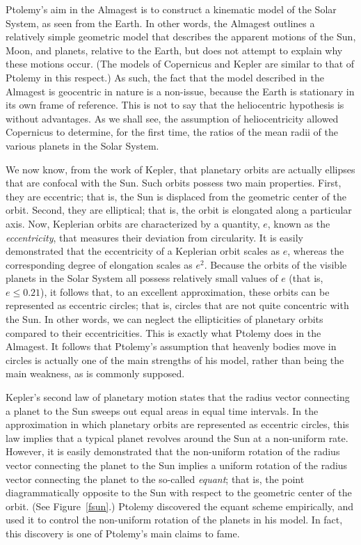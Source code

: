  Ptolemy's aim in the Almagest is to construct a kinematic model of
  the Solar System, as seen from the Earth. In other words, the Almagest outlines a relatively simple geometric model  that describes
 the apparent motions of the Sun, Moon, and planets, relative to the Earth, but does not attempt to explain
 why  these motions occur. (The models of Copernicus and Kepler are similar to that of Ptolemy in this respect.)  As such, the fact that the model described
 in the Almagest is geocentric in nature is a non-issue, because the Earth  is  stationary in its own frame of reference. This is not to say that the
 heliocentric hypothesis is without advantages. As we shall see, the
 assumption of heliocentricity allowed Copernicus to determine, for the first time, the ratios
 of the mean radii of the various planets in the Solar System.
 
 We now know, from the work of Kepler, that  planetary orbits are actually ellipses 
 that are confocal with the Sun. Such orbits possess two  main properties.
 First, they are eccentric; that is,  the Sun is displaced from the
 geometric center of the orbit. Second, they are elliptical; that is, 
  the orbit is elongated along a particular axis. Now, Keplerian orbits are  characterized by a quantity, $e$, known as the {\em eccentricity}, that 
 measures their deviation from circularity. It is easily demonstrated
 that the eccentricity of a Keplerian 
 orbit scales as $e$, whereas the corresponding degree of elongation
 scales as $e^2$. Because the orbits of the visible planets in the Solar System all possess relatively small values of $e$ (that is, $e\leq 0.21$), it follows that, to an excellent approximation, these orbits can be represented as eccentric circles; that is, 
 circles that are not quite concentric with the Sun. In other words,
 we can neglect the ellipticities of planetary orbits compared to
 their eccentricities.
 This is exactly
 what Ptolemy does in the Almagest.
 It follows that Ptolemy's
 assumption that heavenly bodies move in  circles  is actually
 one of the main strengths of his model, rather than 
 being the main weakness, as is commonly
 supposed.
 
 Kepler's second law of planetary motion states that the radius
 vector connecting a planet to the Sun sweeps out equal areas in equal
 time intervals. In the approximation in which planetary orbits
 are represented as eccentric circles, this law implies that a typical planet
 revolves around the Sun at a  non-uniform  rate. However,
 it is easily demonstrated  that the non-uniform rotation of the radius vector connecting the planet to the Sun  implies a  uniform rotation of the radius vector connecting the
 planet to the so-called {\em equant}; that is, the point diagrammatically opposite to the Sun
 with respect to the geometric center of the orbit. (See Figure~\ref{fsun}.)
 Ptolemy discovered the equant scheme empirically, and used it
 to control the non-uniform rotation of the planets in his model.
In fact,  this discovery is one of Ptolemy's main claims to fame.
 
